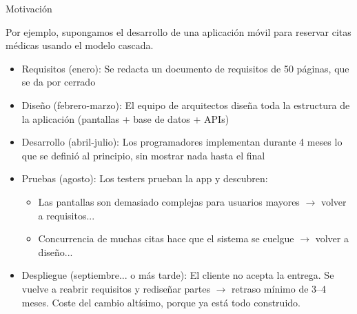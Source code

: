 \documentclass{beamer}
\begin{document}
\begin{frame}{Motivación}

Por ejemplo, supongamos el desarrollo de una aplicación móvil para reservar citas médicas usando el modelo cascada.

\begin{itemize}
    \item Requisitos (enero): Se redacta un documento de requisitos de 50 páginas, que se da por cerrado
    
    \pause
    
    \item Diseño (febrero-marzo): El equipo de arquitectos diseña toda la estructura de la aplicación (pantallas + base de datos + APIs)

    \pause

    \item Desarrollo (abril-julio): Los programadores implementan durante 4 meses lo que se definió al principio, sin mostrar nada hasta el final

    \pause

    \item Pruebas (agosto): Los testers prueban la app y descubren:
    \begin{itemize}
    \item {\color{red} Las pantallas son demasiado complejas para usuarios mayores $\rightarrow$ volver a requisitos...}


    \item {\color{red} Concurrencia de muchas citas hace que el sistema se cuelgue $\rightarrow$ volver a diseño...}
    \end{itemize}

    \pause

    \item {\color{red} Despliegue (septiembre... o más tarde): El cliente no acepta la entrega. Se vuelve a reabrir requisitos y rediseñar partes $\rightarrow$ retraso mínimo de 3–4 meses.
Coste del cambio altísimo, porque ya está todo construido.}
\end{itemize}
    
\end{frame}
\end{document}
